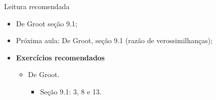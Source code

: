 % 
%   
%     

\begin{frame}{Leitura recomendada}
\begin{itemize}
 \item[\faBook] De Groot seção 9.1;
 \item[\faForward] Próxima aula: De Groot, seção 9.1 (razão de verossimilhanças);
 \item {\large\textbf{Exercícios recomendados}}
 \begin{itemize}
  \item[\faBookmark] De Groot.
  \begin{itemize}
   \item Seção 9.1: 3, 8 e 13.
  \end{itemize}   
  \end{itemize}
 \end{itemize} 
\end{frame}
